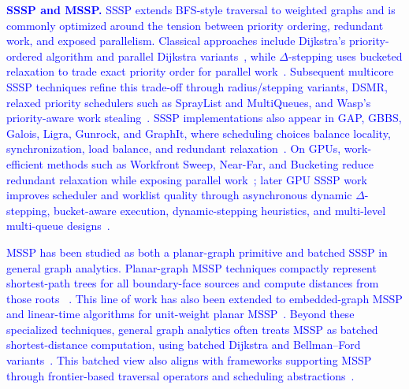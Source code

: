 \noindent
\textcolor{blue}{\textbf{SSSP and MSSP.}
SSSP extends BFS-style traversal to weighted graphs and is commonly optimized around the tension between priority ordering, redundant work, and exposed parallelism.
Classical approaches include Dijkstra's priority-ordered algorithm and parallel Dijkstra variants~\cite{dijkstra1959note,crauser1998parallelization}, while $\Delta$-stepping uses bucketed relaxation to trade exact priority order for parallel work~\cite{meyer2003delta}.
Subsequent multicore SSSP techniques refine this trade-off through radius/stepping variants, DSMR, relaxed priority schedulers such as SprayList and MultiQueues, and Wasp's priority-aware work stealing~\cite{blelloch2016radius,maleki2016dsmr,dong2021efficient,alistarh2015spraylist,rihani2015multiqueues,postnikova2022multiqueues,dantonio2025wasp}.
SSSP implementations also appear in GAP, GBBS, Galois, Ligra, Gunrock, and GraphIt, where scheduling choices balance locality, synchronization, load balance, and redundant relaxation~\cite{azad2020gap,dhulipala2021gbbs,nguyen2013galois,shun2013ligra,wang2016gunrock,zhang2018graphit}.
On GPUs, work-efficient methods such as Workfront Sweep, Near-Far, and Bucketing reduce redundant relaxation while exposing parallel work~\cite{davidson2014work}; later GPU SSSP work improves scheduler and worklist quality through asynchronous dynamic $\Delta$-stepping, bucket-aware execution, dynamic-stepping heuristics, and multi-level multi-queue designs~\cite{wang2021fastsssp,zhang2023bucketaware,yu2025heuristic,hu2026mlmq}.}

\textcolor{blue}{MSSP has been studied as both a planar-graph primitive and batched SSSP in general graph analytics.
Planar-graph MSSP techniques compactly represent shortest-path trees for all boundary-face sources and compute distances from those roots ~\cite{klein2005multiple}.
This line of work has also been extended to embedded-graph MSSP and linear-time algorithms for unit-weight planar MSSP~\cite{cabello2013multiple,eisenstat2013linear}.
Beyond these specialized techniques, general graph analytics often treats MSSP as batched shortest-distance computation, using batched Dijkstra and Bellman--Ford variants~\cite{then2017batched}.
This batched view also aligns with frameworks supporting MSSP through frontier-based traversal operators and scheduling abstractions~\cite{shun2013ligra,wang2016gunrock,zhang2018graphit}.}

